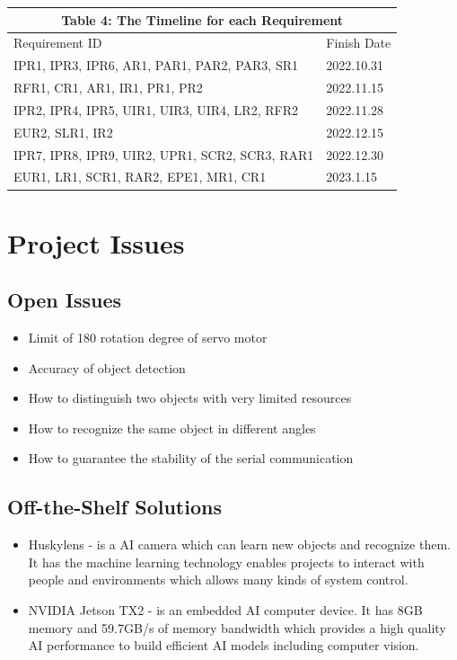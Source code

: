 \documentclass[12pt]{article}
\begin{document}
\begin{tabular}{|p{}|p{}|}

\hline \multicolumn{2}{|c|}{Table 4: The Timeline for each Requirement}\\

\hline Requirement ID&Finish Date\\


\hline IPR1, IPR3, IPR6, AR1, PAR1, PAR2, PAR3, SR1&2022.10.31\\

\hline RFR1, CR1, AR1, IR1, PR1, PR2&2022.11.15\\

\hline IPR2, IPR4, IPR5, UIR1, UIR3, UIR4, LR2, RFR2&2022.11.28\\

\hline EUR2, SLR1, IR2&2022.12.15\\

\hline IPR7, IPR8, IPR9, UIR2, UPR1, SCR2, SCR3, RAR1&2022.12.30\\

\hline EUR1, LR1, SCR1, RAR2, EPE1, MR1, CR1&2023.1.15\\

\hline

\end{tabular}


\section{Project Issues}

\subsection{Open Issues}

\begin{itemize}
    \item Limit of 180 rotation degree of servo motor
    \item Accuracy of object detection 
    \item How to distinguish two objects with very limited resources
    \item How to recognize the same object in different angles
    \item How to guarantee the stability of the serial communication
\end{itemize}


\subsection{Off-the-Shelf Solutions}
\begin{itemize}

    \item Huskylens - is a AI camera which can learn new objects and recognize them. It has the machine learning technology enables projects to interact with people and environments which allows many kinds of system control.
    \item NVIDIA Jetson TX2 - is an embedded AI computer device. It has 8GB memory and 59.7GB/s of memory bandwidth which provides a high quality AI performance to build efficient AI models including computer vision.
\end{itemize}
\end{document}
